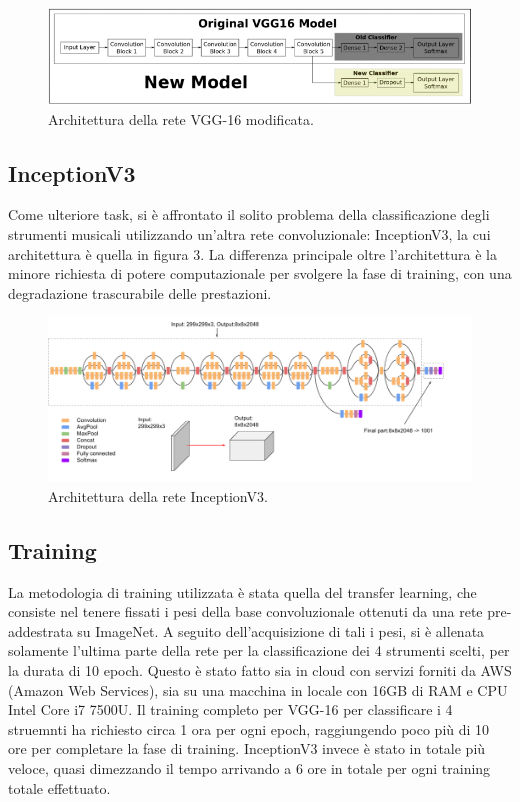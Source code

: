 \documentclass{article}
\begin{document}
\begin{figure}[h]
    \centering
    \includegraphics[width=\linewidth]{immagini/vgg16.png}
    \caption{Architettura della rete VGG-16 modificata.}
    \label{nn:vgg}
\end{figure}

\subsection{InceptionV3}
Come ulteriore task, si è affrontato il solito problema della classificazione degli strumenti musicali utilizzando
un'altra rete convoluzionale: InceptionV3, la cui architettura è quella in figura 3.
La differenza principale oltre l'architettura è la minore richiesta di potere computazionale per svolgere la fase di training, con una degradazione trascurabile delle prestazioni.
\clearpage
\begin{figure}[h]
    \centering
    \includegraphics[width=\linewidth]{immagini/incv3.png}
    \caption{Architettura della rete InceptionV3.}
    \label{nn:inc}
\end{figure}
\subsection{Training}
La metodologia di training utilizzata è stata quella del transfer learning, che consiste nel tenere fissati
i pesi della base convoluzionale ottenuti da una rete pre-addestrata su ImageNet. A seguito dell'acquisizione
di tali i pesi, si è allenata solamente l'ultima parte della rete per la classificazione dei 4 strumenti scelti, per la durata di 10 epoch.
Questo è stato fatto sia in cloud con servizi forniti da AWS (Amazon Web Services), sia su una macchina in locale 
con 16GB di RAM e CPU Intel Core i7 7500U. Il training completo per VGG-16 per classificare i 4 struemnti ha richiesto circa 1 ora per ogni epoch, raggiungendo poco più di 10 ore
per completare la fase di training. InceptionV3 invece è stato in totale più veloce, quasi dimezzando il tempo arrivando a 6 ore in totale per ogni training totale effettuato.
\end{document}
